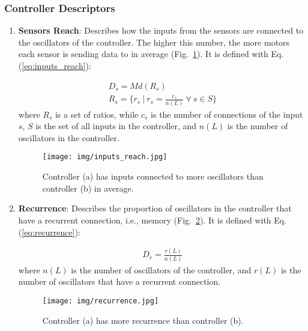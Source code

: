 \documentclass[utf8]{frontiersSCNS} %
\begin{document}
\subsubsection{Controller Descriptors}


\begin{enumerate}
 
   \item \textbf{Sensors Reach}: Describes how the inputs from the sensors are connected to the oscillators of the controller. The higher this number, the more motors each sensor is sending data to in average (Fig.~\ref{inputs_reach}). It is defined with Eq. (\ref{eq:inputs_reach}):

\begin{equation}
\label{eq:inputs_reach}
\begin{aligned}
D_{s} = Md(R_s) \ \ \ \ \ \ \ \ \ \ \ \ \ \ \ \ \ \ \ \ \ \ 
           \\
R_s = \Bigg\{ r_s \ | \ r_s = \frac{c_s}{n(L)} \ \forall \ s \in S \Bigg\}
\end{aligned} 
\end{equation}
\noindent where $R_s$ is a set of ratios, while $c_s$ is the number of connections of the input $s$, $S$ is the set of all inputs in the controller, and $n(L)$ is the number of oscillators in the controller.
 
 \begin{figure}[!htb]
\centerline{\texttt{[image: img/inputs\_reach.jpg]}}
\caption{Controller (a) has inputs connected to more oscillators than controller (b) in average.}
\label{inputs_reach}
\end{figure}

   \item \textbf{Recurrence}: Describes the proportion of oscillators in the controller that have a recurrent connection, i.e., memory (Fig.~\ref{recurrence}). It is defined with Eq. (\ref{eq:recurrence}): 

\begin{equation}
\label{eq:recurrence}
\begin{aligned}
           D_r = \frac{r(L)}{n(L)}
\end{aligned} 
\end{equation}
\noindent where $n(L)$ is the number of oscillators of the controller, and $r(L)$ is the number of oscillators that have a recurrent connection.

 \begin{figure}[!htb]
\centerline{\texttt{[image: img/recurrence.jpg]}}
\caption{Controller (a) has more recurrence than controller (b).}
\label{recurrence}
\end{figure}

\end{enumerate}
\end{document}
